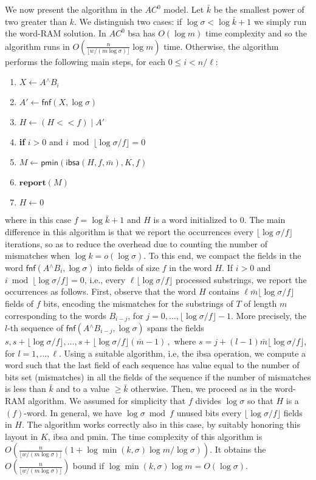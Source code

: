 \documentclass{llncs}
\newcommand{\floor}[1]{\lfloor #1 \rfloor}
\newcommand{\uxor}{\mathrel{^\wedge}}
\newcommand{\uor}{\mathrel{|}}
\newcommand{\fsize}{f}
\newcommand{\word}[1]{#1}
\newcommand{\acbound}{$O(\frac{n}{\floor{w/(m\log\sigma)}} (1 + \log \min(k,\sigma) \log m / \log\sigma))$\xspace}
\newcommand{\fword}[1]{$(#1)$-word}
\begin{document}
We now present the algorithm in the $AC^0$ model. Let $\bar{k}$ be the
smallest power of two greater than $k$. We distinguish two cases: if
$\log\sigma < \log \bar{k} + 1$ we simply run the word-RAM solution. In
$AC^0$ \textsf{bsa} has $O(\log m)$ time complexity and so the
algorithm runs in $O(\frac{n}{\floor{w/(m\log\sigma)}} \log m)$ time.
Otherwise, the algorithm performs the following main steps, for each
$0\le i < n / \ell$:
\begin{enumerate}
\item $\word{X}\leftarrow \word{A} \uxor \word{B}_i$
\item $\word{A'}\leftarrow \textsf{fnf}(\word{X}, \log\sigma)$
\item $\word{H}\leftarrow (\word{H}<< \fsize) \uor \word{A'}$
\item \textbf{if} $i > 0$ and $i\bmod \floor{\log\sigma / \fsize} = 0$
\item \qquad $M\leftarrow \textsf{pmin}(\textsf{ibsa}(\word{H}, \fsize, \bar{m}), K, \fsize)$
\item \qquad $\textbf{report}(M)$
\item \qquad $\word{H}\leftarrow 0$
\end{enumerate}
where in this case $\fsize = \log\bar{k} + 1$ and $\word{H}$ is a word initialized to $0$.
The main difference in this algorithm is that we
report the occurrences every $\floor{\log\sigma / \fsize}$ iterations,
so as to reduce the overhead due to counting the number of mismatches when $\log k = o(\log\sigma)$. To this end, we
compact the fields in the word $\textsf{fnf}(\word{A}\uxor\word{B_i}, \log\sigma)$
into fields of size $\fsize$ in the word $\word{H}$. If $i > 0$ and
$i\bmod \floor{\log\sigma / \fsize} = 0$, i.e., every
$\ell\floor{\log\sigma / \fsize}$ processed substrings, we report the
occurrences as follows. First, observe that the word $H$ contains
$\ell\bar{m}\floor{\log\sigma / \fsize}$ fields of $\fsize$ bits,
encoding the mismatches for the substrings of $T$ of length $m$
corresponding to the words $\word{B}_{i-j}$, for
$j=0,\ldots,\floor{\log\sigma / \fsize}-1$. More precisely, the $l$-th
sequence of $\textsf{fnf}(\word{A} \uxor \word{B}_{i-j}, \log\sigma)$ spans the
fields
$
s, s + \floor{\log\sigma / \fsize}, \ldots, s + \floor{\log\sigma / \fsize}(\bar{m} - 1)\,,
$
where $s = j + (l-1)\bar{m}\floor{\log \sigma / \fsize}$, for
$l=1,\ldots,\ell$. Using a suitable algorithm, i.e, the \textsf{ibsa}
operation, we compute a word such that the last field of each sequence
has value equal to the number of bits set (mismatches) in all the
fields of the sequence if the number of mismatches is less than
$\bar{k}$ and to a value $\ge \bar{k}$ otherwise. Then, we proceed as in the word-RAM algorithm.
We assumed for simplicity that $\fsize$ divides $\log\sigma$ so that
$H$ is a \fword{\fsize}. In general, we have $\log\sigma\bmod f$
unused bits every $\floor{\log\sigma / f}$ fields in $H$. The
algorithm works correctly also in this case, by suitably honoring this
layout in $\word{K}$, \textsf{ibsa} and \textsf{pmin}.
The time complexity of this algorithm is \acbound. It obtains the
$O(\frac{n}{\floor{w/(m\log\sigma)}})$ bound if $\log \min(k,\sigma) \log m =
O(\log\sigma)$.
\end{document}
